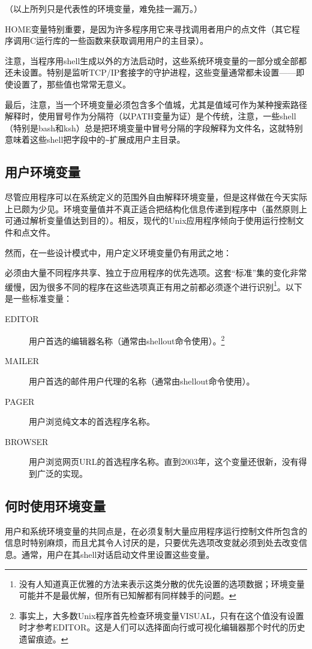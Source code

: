 \documentclass[12pt,oneside]{book}
\begin{document}
（以上所列只是代表性的环境变量，难免挂一漏万。）

HOME变量特别重要，是因为许多程序用它来寻找调用者用户的点文件（其它程序调用C运行库的一些函数来获取调用用户的主目录）。

注意，当程序用shell生成以外的方法启动时，这些系统环境变量的一部分或全部都还未设置。特别是监听TCP/IP套接字的守护进程，这些变量通常都未设置——即使设置了，那些值也常常无意义。

最后，注意，当一个环境变量必须包含多个值城，尤其是值域可作为某种搜索路径解释时，使用冒号作为分隔符（以PATH变量为证）是个传统，注意，一些shell（特别是bash和ksh）总是把环境变量中冒号分隔的字段解释为文件名，这就特别意味着这些shell把字段中的\verb+~+扩展成用户主目录。

\subsection{用户环境变量}
尽管应用程序可以在系统定义的范围外自由解释环境变量，但是这样做在今天实际上已颇为少见。环境变量值并不真正适合把结构化信息传递到程序中（虽然原则上可通过解析变量值达到目的）。相反，现代的Unix应用程序倾向于使用运行控制文件和点文件。

然而，在一些设计模式中，用户定义环境变量仍有用武之地：

必须由大量不同程序共享、独立于应用程序的优先选项。这套“标准”集的变化非常缓慢，因为很多不同的程序在这些选项真正有用之前都必须逐个进行识别\footnote{没有人知道真正优雅的方法来表示这类分散的优先设置的选项数据；环境变量可能并不是最优解，但所有已知解都有同样棘手的问题。}。以下是一些标准变量：
\begin{description}
\item[EDITOR] 用户首选的编辑器名称（通常由shellout命令使用）。\footnote{事实上，大多数Unix程序首先检查环境变量VISUAL，只有在这个值没有设置时才参考EDITOR。这是人们可以选择面向行或可视化编辑器那个时代的历史遗留痕迹。}
\item[MAILER] 用户首选的邮件用户代理的名称（通常由shellout命令使用）。
\item[PAGER] 用户浏览纯文本的首选程序名称。
\item[BROWSER] 用户浏览网页URL的首选程序名称。直到2003年，这个变量还很新，没有得到广泛的实现。
\end{description}


\subsection{何时使用环境变量}
用户和系统环境变量的共同点是，在必须复制大量应用程序运行控制文件所包含的信息时特别麻烦，而且尤其令人讨厌的是，只要优先选项改变就必须到处去改变信息。通常，用户在其shell对话启动文件里设置这些变量。
\end{document}
